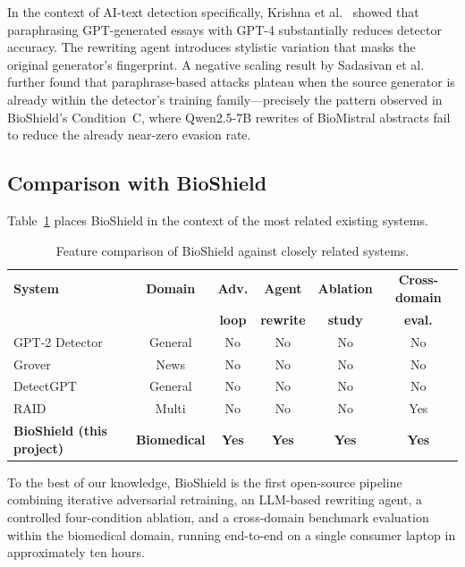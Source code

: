 \documentclass[12pt,a4paper]{article}
\begin{document}
In the context of AI-text detection specifically, Krishna et al.\
\cite{krishna2023paraphrasing} showed that paraphrasing GPT-generated
essays with GPT-4 substantially reduces detector accuracy. The rewriting
agent introduces stylistic variation that masks the original generator's
fingerprint. A negative scaling result by Sadasivan et al.\
\cite{sadasivan2024aigeneratedtext} further found that paraphrase-based
attacks plateau when the source generator is already within the detector's
training family---precisely the pattern observed in BioShield's Condition~C,
where Qwen2.5-7B rewrites of BioMistral abstracts fail to reduce the already
near-zero evasion rate.

\subsection{Comparison with BioShield}

Table~\ref{tab:comparison} places BioShield in the context of the most
related existing systems.

\begin{table}[H]
\centering
\caption{Feature comparison of BioShield against closely related systems.}
\label{tab:comparison}
\renewcommand{\arraystretch}{1.25}
\begin{tabular}{@{}lccccc@{}}
\toprule
\textbf{System} & \textbf{Domain} & \textbf{Adv.} & \textbf{Agent} & \textbf{Ablation} & \textbf{Cross-domain} \\
                &                 & \textbf{loop} & \textbf{rewrite} & \textbf{study} & \textbf{eval.} \\
\midrule
GPT-2 Detector~\cite{solaiman2019releasestrategies}  & General    & No  & No  & No  & No  \\
Grover~\cite{zellers2019defending}                    & News       & No  & No  & No  & No  \\
DetectGPT~\cite{mitchell2023detectgpt}                & General    & No  & No  & No  & No  \\
RAID~\cite{dugan2024raid}                             & Multi      & No  & No  & No  & Yes \\
\textbf{BioShield (this project)}                     & \textbf{Biomedical} & \textbf{Yes} & \textbf{Yes} & \textbf{Yes} & \textbf{Yes} \\
\bottomrule
\end{tabular}
\end{table}

To the best of our knowledge, BioShield is the first open-source pipeline
combining iterative adversarial retraining, an LLM-based rewriting agent,
a controlled four-condition ablation, and a cross-domain benchmark evaluation
within the biomedical domain, running end-to-end on a single consumer laptop
in approximately ten hours.
\end{document}

